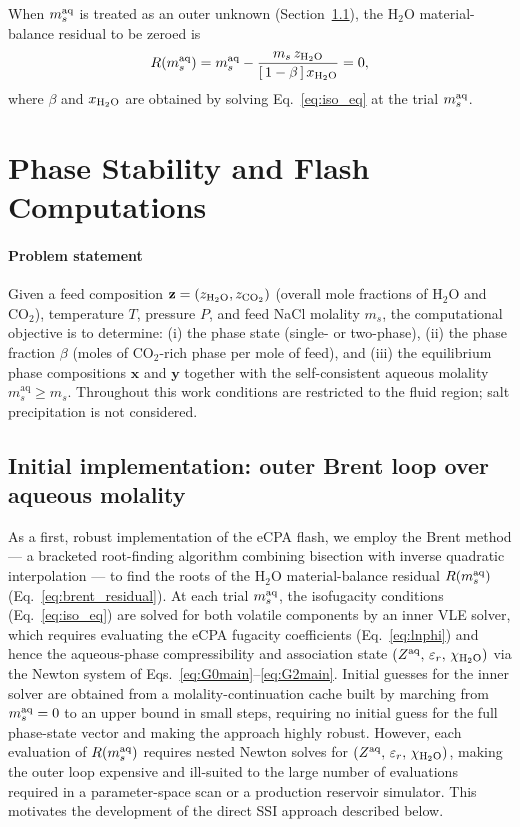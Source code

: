 \documentclass[preprint,12pt,number]{elsarticle}
\begin{document}
When $m_s^{\rm aq}$ is treated as an outer unknown (Section~\ref{sec:brent}),
the H$_2$O material-balance residual to be zeroed is
\begin{equation}
  R\!\left(m_s^{\rm aq}\right)
  = m_s^{\rm aq}
    - \frac{m_s\,z_{\rm H_2O}}{[\,1-\beta\,]\,x_{\rm H_2O}}
  = 0,
  \label{eq:brent_residual}
\end{equation}
where $\beta$ and $x_{\rm H_2O}$ are obtained by solving Eq.~\eqref{eq:iso_eq}
at the trial $m_s^{\rm aq}$.

\section{Phase Stability and Flash Computations}
\label{sec:flash}

\paragraph{Problem statement} Given a feed composition $\mathbf{z} = (z_{\rm H_2O}, z_{\rm CO_2})$ (overall mole fractions of H$_2$O and CO$_2$),
temperature $T$, pressure $P$, and feed NaCl molality $m_s$, the computational
objective is to determine: (i) the phase state (single- or two-phase), (ii) the phase fraction
$\beta$ (moles of CO$_2$-rich phase per mole of feed), and (iii) the equilibrium phase
compositions $\mathbf{x}$ and $\mathbf{y}$ together with the self-consistent aqueous molality
$m_s^\mathrm{aq} \geq m_s$.
Throughout this work conditions are restricted to the fluid region; salt precipitation
is not considered.


\subsection{Initial implementation: outer Brent loop over aqueous molality}
\label{sec:brent}

As a first, robust implementation of the eCPA flash, we employ the Brent method
\citep{Brent1973} — a bracketed root-finding algorithm combining bisection with
inverse quadratic interpolation — to find the roots of the H$_2$O material-balance residual
$R(m_s^{\rm aq})$ (Eq.~\eqref{eq:brent_residual}).
At each trial $m_s^{\rm aq}$, the isofugacity conditions (Eq.~\eqref{eq:iso_eq})
are solved for both volatile components by an inner VLE solver, which requires
evaluating the eCPA fugacity coefficients (Eq.~\eqref{eq:lnphi}) and hence
the aqueous-phase compressibility and association state $(Z^{\rm aq},\,\varepsilon_r,\,\chi_{\rm H_2O})$
via the Newton system of Eqs.~\eqref{eq:G0main}--\eqref{eq:G2main}.
Initial guesses for the inner solver are obtained from a molality-continuation
cache built by marching from $m_s^{\rm aq}=0$ to an upper bound in small steps,
requiring no initial guess for the full phase-state vector and making the approach
highly robust.
However, each evaluation of $R(m_s^{\rm aq})$ requires nested Newton solves
for $(Z^{\rm aq},\,\varepsilon_r,\,\chi_{\rm H_2O})$, making the outer loop expensive and
ill-suited to the large number of evaluations required in a parameter-space scan
or a production reservoir simulator.
This motivates the development of the direct SSI approach described below.
\end{document}

